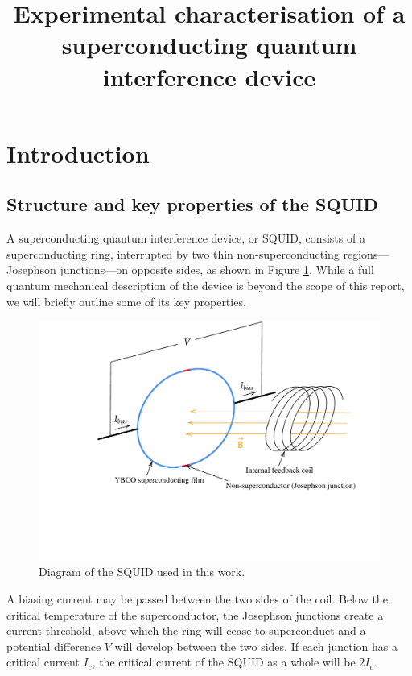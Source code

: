 \documentclass[twocol]{ametsocV6.1}
\title{
	Experimental characterisation of a superconducting quantum
	interference device
}
\affiliation{\aff{a}{
	School of Physics, University of New South Wales,
	Sydney, Australia
}}
\begin{document}
\vspace{5cm}
\maketitle

\section{Introduction} \label{sec:intro}
\subsection{Structure and key properties of the SQUID}
A superconducting quantum interference device, or SQUID, consists of
a superconducting ring, interrupted by two thin non-superconducting
regions---Josephson junctions---on opposite sides, as shown in Figure
\ref{fig:diagram}. While a full quantum mechanical description of the device
is beyond the scope of this report, we will briefly outline some of its
key properties.

\begin{figure}[ht]
	\centering
	\includegraphics[width=\linewidth]{../figures/diagram.pdf}
	\caption{
		Diagram of the SQUID used in this work.
	}
	\label{fig:diagram}
\end{figure}

A biasing current may be passed between the two sides
of the coil. Below the critical
temperature of the superconductor, the Josephson junctions create a
current threshold, above which the ring will cease to superconduct
and a potential difference $V$ will develop between the two sides.
If each junction has a critical current $I_c$, the critical current of
the SQUID as a whole will be $2I_c$.
\end{document}
